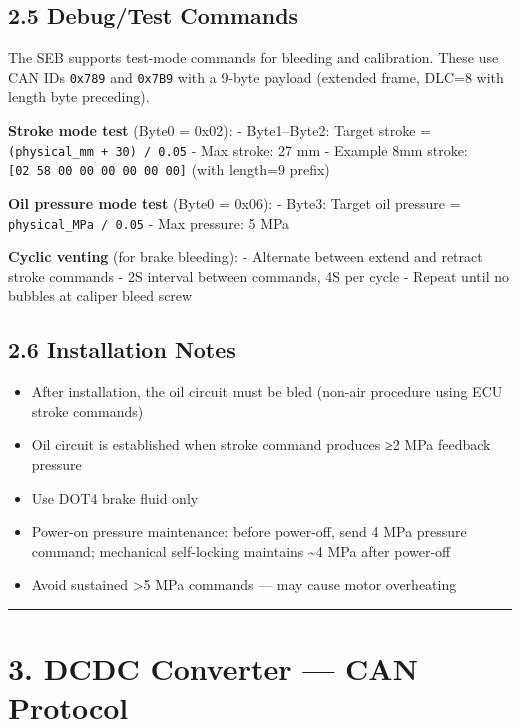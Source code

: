 \documentclass[12pt,a4paper,oneside]{report}
\providecommand{\tightlist}{\setlength{\itemsep}{0pt}\setlength{\parskip}{0pt}}
\begin{document}
\subsection{2.5 Debug/Test Commands}\label{debugtest-commands}

The SEB supports test-mode commands for bleeding and calibration. These use CAN
IDs \texttt{0x789} and \texttt{0x7B9} with a 9-byte payload (extended frame,
DLC=8 with length byte preceding).

\textbf{Stroke mode test} (Byte0 = 0x02): - Byte1--Byte2: Target stroke =
\texttt{(physical\_mm\ +\ 30)\ /\ 0.05} - Max stroke: 27 mm - Example 8mm
stroke: \texttt{{[}02\ 58\ 00\ 00\ 00\ 00\ 00\ 00{]}} (with length=9 prefix)

\textbf{Oil pressure mode test} (Byte0 = 0x06): - Byte3: Target oil pressure =
\texttt{physical\_MPa\ /\ 0.05} - Max pressure: 5 MPa

\textbf{Cyclic venting} (for brake bleeding): - Alternate between extend and
retract stroke commands - 2S interval between commands, 4S per cycle - Repeat
until no bubbles at caliper bleed screw

\subsection{2.6 Installation Notes}\label{installation-notes-1}

\begin{itemize}
\tightlist
\item
  After installation, the oil circuit must be bled (non-air procedure using ECU
  stroke commands)
\item
  Oil circuit is established when stroke command produces ≥2 MPa feedback
  pressure
\item
  Use DOT4 brake fluid only
\item
  Power-on pressure maintenance: before power-off, send 4 MPa pressure command;
  mechanical self-locking maintains \textasciitilde4 MPa after power-off
\item
  Avoid sustained \textgreater5 MPa commands --- may cause motor overheating
\end{itemize}

\begin{center}\rule{0.5\linewidth}{0.5pt}\end{center}

\section{3. DCDC Converter --- CAN Protocol}\label{dcdc-converter-can-protocol}
\end{document}
